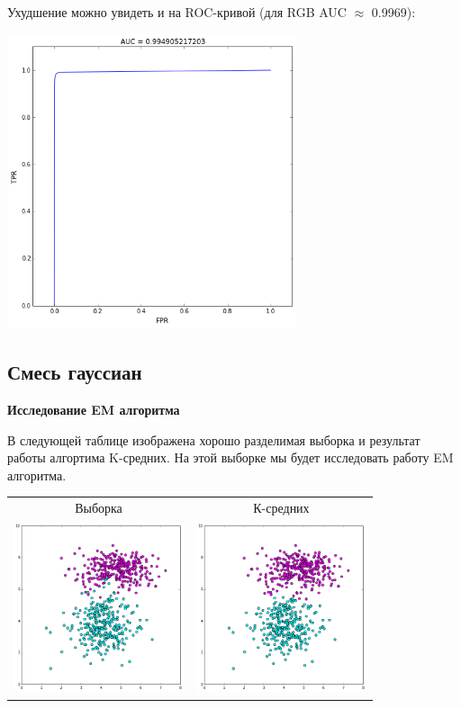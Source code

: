 \documentclass[12pt, a4paper]{article}
\begin{document}
			Ухудшение можно увидеть и на ROC-кривой (для RGB AUC $\approx$ 0.9969):
			\begin{center}
				\includegraphics[width=8.5cm]{3_par_hsv_auc.png}
			\end{center}

		\newpage
		\subsection{Смесь гауссиан}
			{\bf Исследование EM алгоритма}

			В следующей таблице изображена хорошо разделимая выборка и результат работы алгортима K-средних. На этой выборке мы будет исследовать работу EM алгоритма.

			\begin{center}
			\begin{tabular}{ c  c }
				Выборка & К-средних \\

				\includegraphics[width=5cm]{4par_orig.png} &
				\includegraphics[width=5cm]{4par_kmean.png} \\
			\end{tabular}
			\end{center}
\end{document}
